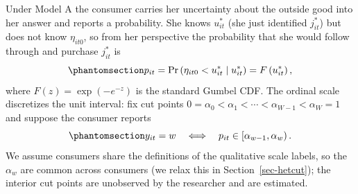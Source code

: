\documentclass[
  letterpaper,
  DIV=11,
  numbers=noendperiod]{scrartcl}
\theoremstyle{plain}
\theoremstyle{plain}
\theoremstyle{remark}
\begin{document}
Under Model A the consumer carries her uncertainty about the outside
good into her answer and reports a probability. She knows \(u^*_{it}\)
(she just identified \(j^*_{it}\)) but does not know \(\eta_{it0}\), so
from her perspective the probability that she would follow through and
purchase \(j^*_{it}\) is
\begin{equation}\protect\phantomsection\label{eq-purchprob}{
p_{it} = \Pr \left( \eta_{it0} < u^*_{it} \mid u^*_{it} \right) = F\left( u^*_{it} \right),
}\end{equation} where \(F(z) = \exp(-e^{-z})\) is the standard Gumbel
CDF. The ordinal scale discretizes the unit interval: fix cut points
\(0 = \alpha_0 < \alpha_1 < \cdots < \alpha_{W-1} < \alpha_W = 1\) and
suppose the consumer reports
\begin{equation}\protect\phantomsection\label{eq-reportruleA}{
y_{it} = w
\quad \Longleftrightarrow \quad
p_{it} \in \left[ \alpha_{w-1}, \alpha_w \right).
}\end{equation} We assume consumers share the definitions of the
qualitative scale labels, so the \(\alpha_w\) are common across
consumers (we relax this in Section~\ref{sec-hetcut}); the interior cut
points are unobserved by the researcher and are estimated.
\end{document}
